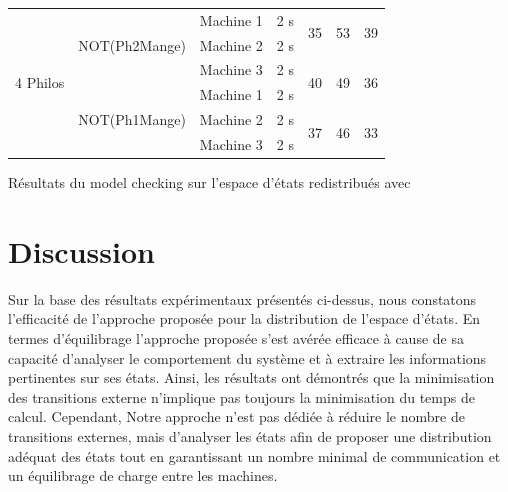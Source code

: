 \begin{tableth}
\begin{tabular}{|c|c|c||c||c|c|c|}
		\multirow{6}{*}{4 Philos} &  \multirow{3}{*}{\tiny NOT(Ph2Mange)}  & Machine 1 &    2 s    & \multirow{2}{*}{35} & \multirow{2}{*}{53} & \multirow{2}{*}{39} \\ \cline{3-4}
		                          &                                        & Machine 2 &    2 s    &                     &                     &                     \\ \cline{3-7}
		                          &                                        & Machine 3 &    2 s    & \multirow{2}{*}{40} & \multirow{2}{*}{49} & \multirow{2}{*}{36} \\ \cline{2-4}
		                          &  \multirow{3}{*}{\tiny NOT(Ph1Mange)}  & Machine 1 &    2 s    & &                     &                     \\ \cline{3-7}
		                          &                                        & Machine 2 &    2 s    &  \multirow{2}{*}{37} & \multirow{2}{*}{46} & \multirow{2}{*}{33} \\ \cline{3-4}
		                          &                                        & Machine 3 &   2 s    &                     &                     &                     \\ \hline\hline
	\end{tabular}
	\caption{Résultats du model checking sur l'espace d'états redistribués avec \textbf{\CDS{}} }\label{tableau2}
\end{tableth}
 
\section{Discussion}

Sur la base des résultats expérimentaux présentés ci-dessus, nous constatons l’efficacité de l’approche proposée pour la distribution de l’espace d'états. En termes d’équilibrage l’approche proposée s’est avérée efficace à cause de sa capacité d’analyser le comportement du système et à extraire les informations pertinentes sur ses états. Ainsi, les résultats ont démontrés que la minimisation des transitions externe n'implique pas toujours la minimisation du temps de calcul. Cependant, Notre approche n'est pas dédiée à réduire le nombre de transitions externes, mais d'analyser les états afin de proposer une distribution adéquat des états tout en garantissant un nombre minimal de communication et un équilibrage de charge entre les machines.
